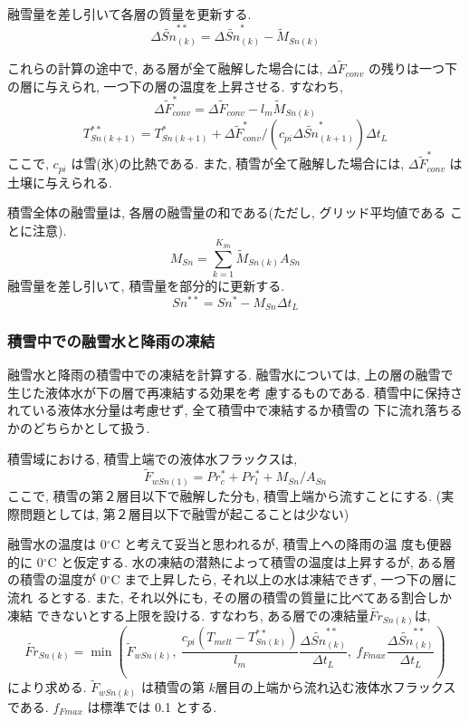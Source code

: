 融雪量を差し引いて各層の質量を更新する.
\begin{equation}
 \Delta \widetilde{Sn}_{(k)}^{**} = \Delta \widetilde{Sn}_{(k)}^{*}
 - \widetilde{M}_{Sn(k)}
\end{equation}

これらの計算の途中で, ある層が全て融解した場合には,
$\Delta \widetilde{F}_{conv}$ の残りは一つ下の層に与えられ,
一つ下の層の温度を上昇させる. すなわち,
\begin{equation}
 \Delta \widetilde{F}_{conv}^* = \Delta \widetilde{F}_{conv} - l_m \widetilde{M}_{Sn(k)}
\end{equation}
\begin{equation}
 T_{Sn(k+1)}^{**} = T_{Sn(k+1)}^{*} + \Delta \widetilde{F}_{conv}^* / (c_{pi} \Delta \widetilde{Sn}_{(k+1)}^*) \Delta t_L
\end{equation}
ここで, $c_{pi}$ は雪(氷)の比熱である.
また, 積雪が全て融解した場合には,
 $\Delta \widetilde{F}_{conv}^*$ は土壌に与えられる.

積雪全体の融雪量は, 各層の融雪量の和である(ただし, グリッド平均値である
ことに注意).
\begin{equation}
 M_{Sn} = \sum_{k=1}^{K_{Sn}} \widetilde{M}_{Sn(k)} A_{Sn}
\end{equation}
融雪量を差し引いて, 積雪量を部分的に更新する.
\begin{equation}
 Sn^{**} = Sn^{*} - M_{Sn} \Delta t_L
\end{equation}

\subsubsection{積雪中での融雪水と降雨の凍結}

融雪水と降雨の積雪中での凍結を計算する.
融雪水については, 上の層の融雪で生じた液体水が下の層で再凍結する効果を考
慮するものである.
積雪中に保持されている液体水分量は考慮せず, 全て積雪中で凍結するか積雪の
下に流れ落ちるかのどちらかとして扱う.

積雪域における, 積雪上端での液体水フラックスは,
\begin{equation}
 \widetilde{F}_{wSn(1)} = Pr_c^* + Pr_l^* + M_{Sn} / A_{Sn}
\end{equation}
ここで, 積雪の第２層目以下で融解した分も, 積雪上端から流すことにする.
(実際問題としては, 第２層目以下で融雪が起こることは少ない)

融雪水の温度は 0$^{\circ}$C と考えて妥当と思われるが, 積雪上への降雨の温
度も便器的に 0$^{\circ}$C と仮定する.
水の凍結の潜熱によって積雪の温度は上昇するが, ある層の積雪の温度が
0$^{\circ}$C まで上昇したら, それ以上の水は凍結できず, 一つ下の層に流れ
るとする. また, それ以外にも, その層の積雪の質量に比べてある割合しか凍結
できないとする上限を設ける. すなわち, ある層での凍結量$\widetilde{Fr}_{Sn(k)}$は,
\begin{equation}
 \widetilde{Fr}_{Sn(k)} = \min\left( \widetilde{F}_{wSn(k)}, \
\frac{c_{pi}(T_{melt}-T_{Sn(k)}^{**})}{l_m}
\frac{\Delta \widetilde{Sn}_{(k)}^{**}}{\Delta t_L} , \
f_{Fmax}\frac{\Delta \widetilde{Sn}_{(k)}^{**}}{\Delta t_L} \right)
\end{equation}
により求める.
$\widetilde{F}_{wSn(k)}$ は積雪の第 $k$層目の上端から流れ込む液体水フラックスである.
$f_{Fmax}$ は標準では 0.1 とする.

